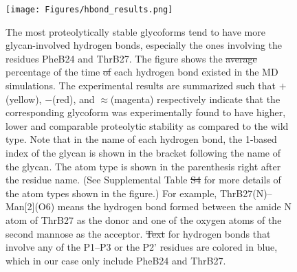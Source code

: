 \documentclass[9pt]{elife}
\providecommand{\DIFaddtex}[1]{{\protect\color{blue}\uwave{#1}}} %
\providecommand{\DIFdeltex}[1]{{\protect\color{red}\sout{#1}}}                      %
\providecommand{\DIFaddFL}[1]{\DIFadd{#1}} %
\providecommand{\DIFdelFL}[1]{\DIFdel{#1}} %
\providecommand{\DIFaddbeginFL}{} %
\providecommand{\DIFaddendFL}{} %
\providecommand{\DIFdelbeginFL}{} %
\providecommand{\DIFdelendFL}{} %
\providecommand{\DIFadd}[1]{\texorpdfstring{\DIFaddtex{#1}}{#1}} %
\providecommand{\DIFdel}[1]{\texorpdfstring{\DIFdeltex{#1}}{}} %
\begin{document}
\begin{figure}[H]
\centering
\texttt{[image: Figures/hbond\_results.png]}
\caption{The most proteolytically stable glycoforms tend to have more glycan-involved hydrogen bonds, especially the ones involving the residues PheB24 and ThrB27. The figure shows the \DIFdelbeginFL \DIFdelFL{average }\DIFdelendFL percentage of the time \DIFdelbeginFL \DIFdelFL{of }\DIFdelendFL each \DIFaddbeginFL \DIFaddFL{kind of }\DIFaddendFL hydrogen bond existed in the MD simulations. The experimental results are summarized such that $+$(yellow), $-$(red), and $\approx$(magenta) respectively indicate that the corresponding glycoform was experimentally found to have higher, lower and comparable proteolytic stability as compared to the wild type. Note that in the name of each hydrogen bond, the 1-based index of the glycan is shown in the bracket following the name of the glycan. The atom type is shown in the parenthesis right after the residue name. (See Supplemental Table \DIFdelbeginFL \DIFdelFL{S4 }\DIFdelendFL \DIFaddbeginFL \DIFaddFL{S6 }\DIFaddendFL for more details of the atom types shown in the figure.) For example, ThrB27(N)--Man[2](O6) means the hydrogen bond formed between the amide N atom of ThrB27 as the donor and one of the oxygen atoms of the second mannose as the acceptor. \DIFdelbeginFL \DIFdelFL{Text }\DIFdelendFL \DIFaddbeginFL \DIFaddFL{Texts }\DIFaddendFL for hydrogen bonds that involve any of the P1--P3 or the P2' residues are colored in blue, which in our case only include PheB24 and ThrB27.}
\label{result_hbond}
\end{figure}
\end{document}
